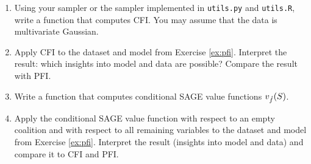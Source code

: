 {\begin{enumerate}
\begin{enumerate}
\begin{equation}
        \end{equation}
        \item Then write a function, that takes the conditional mean and covariate structure and allows to sample from the respective (multivariate) Gaussian.
    \end{enumerate}
    \item Using your sampler or the sampler implemented in \texttt{utils.py} and \texttt{utils.R}, write a function that computes CFI. You may assume that the data is multivariate Gaussian.
    \item Apply CFI to the dataset and model from Exercise \ref{ex:pfi}. Interpret the result: which insights into model and data are possible? Compare the result with PFI.
    \item Write a function that computes conditional SAGE value functions $v_{\fh}(S)$.
    \item Apply the conditional SAGE value function with respect to an empty coalition and with respect to all remaining variables to the dataset and model from Exercise \ref{ex:pfi}. Interpret the result (insights into model and data) and compare it to CFI and PFI.
\end{enumerate}
}

